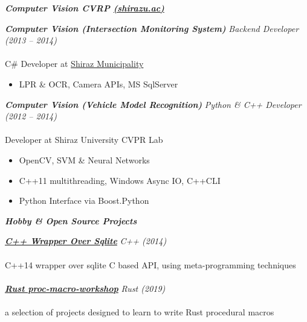 \documentclass{article}
\newcommand{\hh}[1]{\large{\textit{\textbf{#1}}}}
\newcommand{\hhhh}[1]{\LARGE{\textit{\textbf{#1}}}}
\renewcommand{\i}[1]{\normalsize{\textit{#1}}}
\begin{document}
\vspace{.2cm}
 {\hhhh{Computer Vision CVRP \href{http://shirazu.ac.ir/en}{(shirazu.ac)}}}
 
\hh{Computer Vision (Intersection Monitoring System)} \hfill \i{Backend Developer (2013 -- 2014)} \\ \vspace{-.35cm} \\
C\# Developer at \href{https://portal.shiraz.ir/}{Shiraz Municipality} \\ \vspace {-.90cm}
\begin{itemize}
 \setlength{\itemsep}{1pt} \setlength{\parskip}{0pt} \setlength{\parsep}{0pt}
 \item LPR \& OCR, Camera APIs, MS SqlServer
\end{itemize}

\hh{Computer Vision (Vehicle Model Recognition)} \hfill \i{Python \& C++ Developer (2012 -- 2014)} \\ \vspace{-.35cm} \\
Developer at Shiraz University CVPR Lab \\ \vspace{-.9cm}
\begin{itemize}
 \setlength{\itemsep}{1pt} \setlength{\parskip}{0pt} \setlength{\parsep}{0pt}
 \item OpenCV, SVM \& Neural Networks
 \item C++11 multithreading, Windows Async IO, C++\/CLI
 \item Python Interface via Boost.Python
\end{itemize}

\vspace{.2cm}
 {\hhhh{Hobby \& Open Source Projects}}
 
\hh{\href{https://github.com/aminroosta/sqlite_modern_cpp}{C++ Wrapper Over Sqlite}}
\hfill \i{C++ (2014)} \\ \vspace {-.35cm} \\
C++14 wrapper over sqlite C based API, using meta-programming techniques \\ \vspace{-.35cm} \\

\hh{\href{https://github.com/aminroosta/proc-macro-workshop}{Rust proc-macro-workshop}}
\hfill \i{Rust (2019)} \\ \vspace {-.35cm} \\
 a selection of projects designed to learn to write Rust procedural macros \\ \vspace{-.35cm} \\
\end{document}
